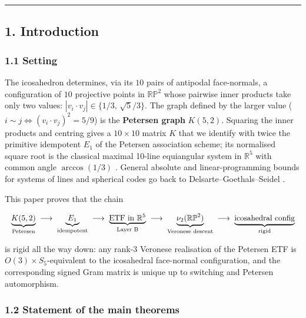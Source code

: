 \documentclass[
]{article}
\begin{document}
\begin{center}\rule{0.5\linewidth}{0.5pt}\end{center}

\subsection{1. Introduction}\label{introduction}

\subsubsection{1.1 Setting}\label{setting}

The icosahedron determines, via its \(10\) pairs of antipodal
face-normals, a configuration of \(10\) projective points in
\(\mathbb{RP}^2\) whose pairwise inner products take only two values:
\(|v_i\cdot v_j| \in
\{1/3,\,\sqrt{5}/3\}\). The graph defined by the larger value
(\(i \sim j \iff (v_i\cdot v_j)^2 = 5/9\)) is the \textbf{Petersen
graph} \(K(5,2)\). Squaring the inner products and centring gives a
\(10\times 10\) matrix \(K\) that we identify with twice the primitive
idempotent \(E_1\) of the Petersen association scheme; its normalised
square root is the classical maximal 10-line equiangular system in
\(\mathbb{R}^5\) with common angle \(\arccos(1/3)\) \cite{vLS66,LS73,Tay77}. General absolute and linear-programming bounds for systems of
lines and spherical codes go back to Delsarte--Goethals--Seidel
\cite{DGS75,DGS77}.

This paper proves that the chain

\[
\resizebox{\linewidth}{!}{$
\underbrace{K(5,2)}_{\text{Petersen}}
\;\longrightarrow\;
\underbrace{E_1}_{\text{idempotent}}
\;\longrightarrow\;
\underbrace{\text{ETF in }\mathbb{R}^5}_{\text{Layer B}}
\;\longrightarrow\;
\underbrace{\nu_2(\mathbb{RP}^2)}_{\text{Veronese descent}}
\;\longrightarrow\;
\underbrace{\text{icosahedral config}}_{\text{rigid}}
$}
\]

is rigid all the way down: any rank-\(3\) Veronese realisation of the
Petersen ETF is \(O(3) \times S_5\)-equivalent to the icosahedral
face-normal configuration, and the corresponding signed Gram matrix is
unique up to switching and Petersen automorphism.

\subsubsection{1.2 Statement of the main
theorems}\label{statement-of-the-main-theorems}
\end{document}

